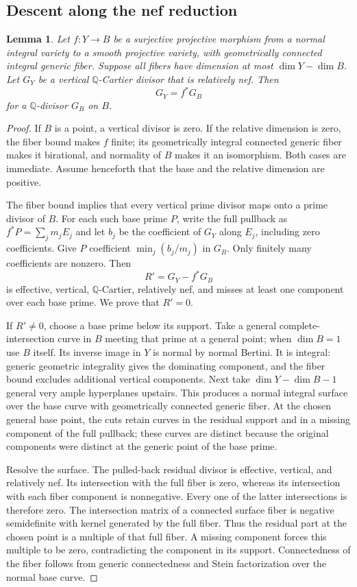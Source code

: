 \documentclass[11pt,letterpaper]{article}
\newcommand{\Q}{\mathbb{Q}}
\newtheorem{lemma}[theorem]{Lemma}
\theoremstyle{definition}
\theoremstyle{remark}
\begin{document}
\subsection{Descent along the nef reduction}

\begin{lemma}\label{proj:sg:vertical-descent}
Let $f:Y\to B$ be a surjective projective morphism from a
normal integral variety to a smooth projective variety,
with geometrically connected integral generic fiber.
Suppose all fibers have dimension at most
$\dim Y-\dim B$.  Let $G_Y$ be a vertical $\Q$-Cartier
divisor that is relatively nef.  Then
\[
 G_Y=f^*G_B
\]
for a $\Q$-divisor $G_B$ on $B$.
\end{lemma}

\begin{proof}
If $B$ is a point, a vertical divisor is zero.  If the
relative dimension is zero, the fiber bound makes $f$
finite; its geometrically integral connected generic
fiber makes it birational, and normality of $B$ makes
it an isomorphism.  Both cases are immediate.  Assume
henceforth that the base and the relative dimension
are positive.

The fiber bound implies that every vertical prime divisor
maps onto a prime divisor of $B$.  For each such base
prime $P$, write the full pullback as
$f^*P=\sum_jm_jE_j$ and let $b_j$ be the coefficient of
$G_Y$ along $E_j$, including zero coefficients.
Give $P$ coefficient $\min_j(b_j/m_j)$ in $G_B$.
Only finitely many coefficients are nonzero.  Then
\[
 R'=G_Y-f^*G_B
\]
is effective, vertical, $\Q$-Cartier, relatively nef,
and misses at least one component over each base prime.
We prove that $R'=0$.

If $R'\ne0$, choose a base prime below its support.
Take a general complete-intersection curve in $B$
meeting that prime at a general point; when $\dim B=1$
use $B$ itself.  Its inverse image in $Y$ is normal
by normal Bertini.  It is integral: generic geometric
integrality gives the dominating component, and the
fiber bound excludes additional vertical components.
Next take $\dim Y-\dim B-1$ general very ample
hyperplanes upstairs.  This produces a normal integral
surface over the base curve with geometrically connected
generic fiber.  At the chosen general base point,
the cuts retain curves in the residual support and in
a missing component of the full pullback; these curves
are distinct because the original components were
distinct at the generic point of the base prime.

Resolve the surface.  The pulled-back residual divisor
is effective, vertical, and relatively nef.  Its
intersection with the full fiber is zero, whereas its
intersection with each fiber component is nonnegative.
Every one of the latter intersections is therefore zero.
The intersection matrix of a connected surface fiber
is negative semidefinite with kernel generated by the
full fiber.  Thus the residual part at the chosen point
is a multiple of that full fiber.  A missing component
forces this multiple to be zero, contradicting the
component in its support.  Connectedness of the fiber
follows from generic connectedness and Stein
factorization over the normal base curve.
\end{proof}
\end{document}
